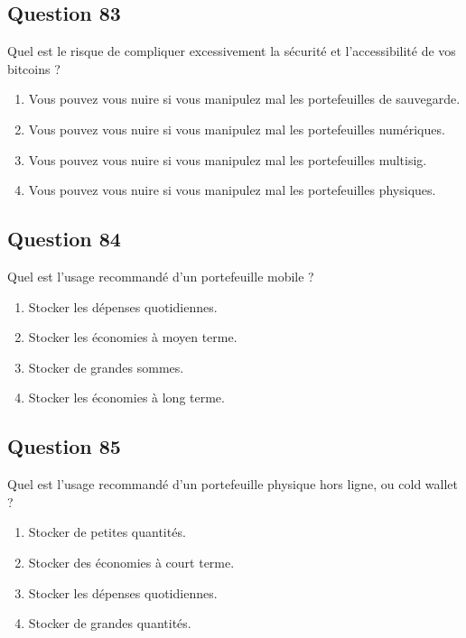 \documentclass[12pt,a4paper]{article}
\begin{document}
\bigskip


\subsection*{Question 83}
Quel est le risque de compliquer excessivement la sécurité et l'accessibilité de vos bitcoins ?

\begin{enumerate}[label=\Alph*., leftmargin=*]
\item Vous pouvez vous nuire si vous manipulez mal les portefeuilles de sauvegarde.
\item Vous pouvez vous nuire si vous manipulez mal les portefeuilles numériques.
\item Vous pouvez vous nuire si vous manipulez mal les portefeuilles multisig.
\item Vous pouvez vous nuire si vous manipulez mal les portefeuilles physiques.
\end{enumerate}

\bigskip


\subsection*{Question 84}
Quel est l'usage recommandé d'un portefeuille mobile ?

\begin{enumerate}[label=\Alph*., leftmargin=*]
\item Stocker les dépenses quotidiennes.
\item Stocker les économies à moyen terme.
\item Stocker de grandes sommes.
\item Stocker les économies à long terme.
\end{enumerate}

\bigskip


\subsection*{Question 85}
Quel est l'usage recommandé d'un portefeuille physique hors ligne, ou cold wallet ?

\begin{enumerate}[label=\Alph*., leftmargin=*]
\item Stocker de petites quantités.
\item Stocker des économies à court terme.
\item Stocker les dépenses quotidiennes.
\item Stocker de grandes quantités.
\end{enumerate}
\end{document}
